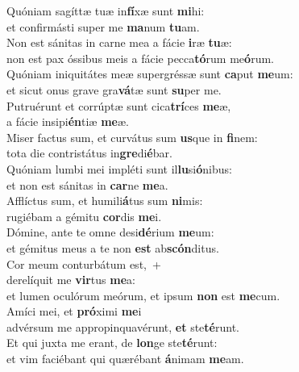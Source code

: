 \evenverse Quóniam sagíttæ tuæ in\textbf{fí}xæ sunt \textbf{mi}hi:~\*\\
\evenverse et confirmásti super me \textbf{ma}num \textbf{tu}am.\\
\oddverse Non est sánitas in carne mea a fácie \textbf{i}ræ \textbf{tu}æ:~\*\\
\oddverse non est pax óssibus meis a fácie pecca\textbf{tó}rum me\textbf{ó}rum.\\
\evenverse Quóniam iniquitátes meæ supergréssæ sunt \textbf{ca}put \textbf{me}um:~\*\\
\evenverse et sicut onus grave gra\textbf{vá}tæ sunt \textbf{su}per me.\\
\oddverse Putruérunt et corrúptæ sunt cica\textbf{trí}ces \textbf{me}æ,~\*\\
\oddverse a fácie insipi\textbf{én}tiæ \textbf{me}æ.\\
\evenverse Miser factus sum, et curvátus sum \textbf{us}que in \textbf{fi}nem:~\*\\
\evenverse tota die contristátus in\textbf{gre}di\textbf{é}bar.\\
\oddverse Quóniam lumbi mei impléti sunt il\textbf{lu}si\textbf{ó}nibus:~\*\\
\oddverse et non est sánitas in \textbf{car}ne \textbf{me}a.\\
\evenverse Afflíctus sum, et humili\textbf{á}tus sum \textbf{ni}mis:~\*\\
\evenverse rugiébam a gémitu \textbf{cor}dis \textbf{me}i.\\
\oddverse Dómine, ante te omne desi\textbf{dé}rium \textbf{me}um:~\*\\
\oddverse et gémitus meus a te non \textbf{est} ab\textbf{scón}ditus.\\
\evenverse Cor meum conturbátum est,~+\\
\evenverse  derelíquit me \textbf{vir}tus \textbf{me}a:~\*\\
\evenverse et lumen oculórum meórum, et ipsum \textbf{non} est \textbf{me}cum.\\
\oddverse Amíci mei, et \textbf{pró}ximi \textbf{me}i~\*\\
\oddverse advérsum me appropinquavérunt, \textbf{et} ste\textbf{té}runt.\\
\evenverse Et qui juxta me erant, de \textbf{lon}ge ste\textbf{té}runt:~\*\\
\evenverse et vim faciébant qui quærébant \textbf{á}nimam \textbf{me}am.\\
